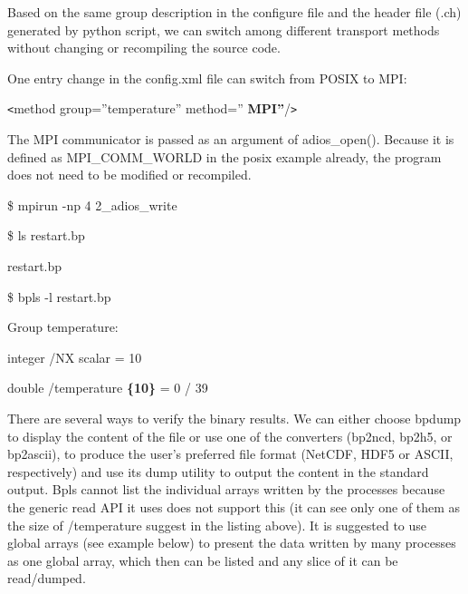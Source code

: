 \vspace{10pt}
Based on the same group description in the configure file and the header file (.ch) 
generated by python script, we can switch among different transport methods without 
changing or recompiling the source code.

\vspace{10pt}
One entry change in the config.xml file can switch from POSIX to MPI:

\vspace{10pt}
\leftskip=18pt
\texttt{<}method group=''temperature'' method=''{\color{color02} \textbf{MPI''}}/\texttt{>}

\vspace{10pt}
\leftskip=0pt
The MPI communicator is passed as an argument of adios\_open(). Because it is defined 
as MPI\_COMM\_WORLD in the posix example already, the program does not need to 
be modified or recompiled.

\vspace{10pt}
\$ mpirun -np 4 2\_adios\_write

\vspace{10pt}
\$ ls restart.bp

\vspace{10pt}
restart.bp

\vspace{10pt}
\$ bpls -l restart.bp

\vspace{10pt}
Group temperature:

\vspace{10pt}
\parindent=7pt
integer    /NX           scalar = 10 

\vspace{10pt}
double     /temperature  {\color{color06} \textbf{\{10\}}} = 0 / 39

\vspace{22pt}
\parindent=0pt
There are several ways to verify the binary results. We can either choose bpdump 
to display the content of the file or use one of the converters (bp2ncd, bp2h5, 
or bp2ascii), to produce the user's preferred file format (NetCDF, HDF5 or ASCII, 
respectively) and use its dump utility to output the content in the standard output. 
Bpls cannot list the individual arrays written by the processes because the generic 
read API it uses does not support this (it can see only one of them as the size 
of /temperature suggest in the listing above). It is suggested to use global arrays 
(see example below) to present the data written by many processes as one global 
array, which then can be listed and any slice of it can be read/dumped. 

